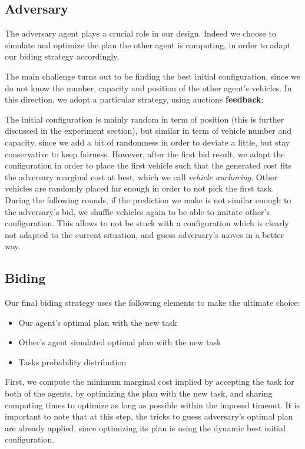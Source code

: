 \documentclass[11pt]{article}
\begin{document}
\subsection{Adversary}
The adversary agent plays a crucial role in our design. Indeed we choose to simulate and optimize the plan the other agent is computing, in order to adapt our biding strategy accordingly.

The main challenge turns out to be finding the best initial configuration, since we do not know the number, capacity and position of the other agent's vehicles. In this direction, we adopt a particular strategy, using auctions \textbf{feedback}:

The initial configuration is mainly random in term of position (this is further discussed in the experiment section), but similar in term of vehicle number and capacity, since we add a bit of randomness in order to deviate a little, but stay conservative to keep fairness. However, after the first bid result, we adapt the configuration in order to place the first vehicle such that the generated cost fits the adversary marginal cost at best, which we call \textit{vehicle anchoring}. Other vehicles are randomly placed far enough in order to not pick the first task. During the following rounds, if the prediction we make is not similar enough to the adversary's bid, we shuffle vehicles again to be able to imitate other's configuration. This allows to not be stuck with a configuration which is clearly not adapted to the current situation, and guess adversary's moves in a better way.


\subsection{Biding}
Our final biding strategy uses the following elements to make the ultimate choice:
\begin{itemize}
	\item Our agent's optimal plan with the new task
	\item Other's agent simulated optimal plan with the new task
	\item Tasks probability distribution
\end{itemize}

First, we compute the minimum marginal cost implied by accepting the task for both of the agents, by optimizing the plan with the new task, and sharing computing times to optimize as long as possible within the imposed timeout. It is important to note that at this step, the tricks to guess adversary's optimal plan are already applied, since optimizing its plan is using the dynamic best initial configuration.
\end{document}
